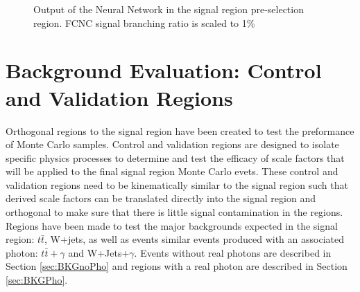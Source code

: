 \begin{figure}[h!]
\centering
{}\hfil
{}
\caption{Output of the Neural Network in the signal region pre-selection region.  FCNC signal branching ratio is scaled to 1\%}
\label{fig:PreSelPlots5}
\end{figure}

\section{Background Evaluation: Control and Validation Regions}
\label{sec:BkgEvalCRVR}
Orthogonal regions to the signal region have been created to test the preformance of Monte Carlo samples.  Control and validation regions are designed to isolate specific physics processes to determine and test the efficacy of scale factors that will be applied to the final signal region Monte Carlo evets.  These control and validation regions need to be kinematically similar to the signal region such that derived scale factors can be translated directly into the signal region and orthogonal to make sure that there is little signal contamination in the regions.  Regions have been made to test the major backgrounds expected in the signal region: $t\bar{t}$, W+jets, as well as events similar events produced with an associated photon: $t\bar{t}+\gamma$ and W+Jets+$\gamma$.  Events without real photons are described in Section \ref{sec:BKGnoPho} and regions with a real photon are described in Section \ref{sec:BKGPho}.

